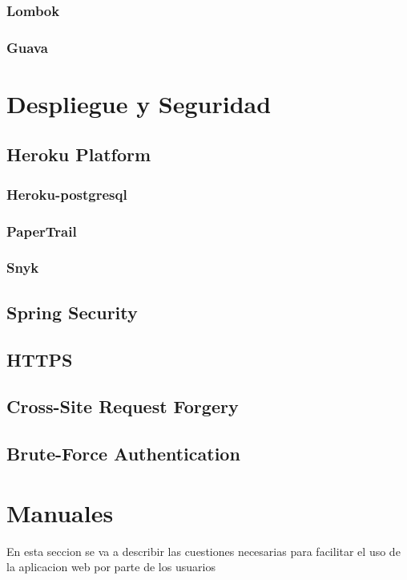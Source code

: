 \documentclass[a4paper]{report}
\begin{document}
    \subsubsection{Lombok}
    \subsubsection{Guava}

    \section{Despliegue y Seguridad}
        \subsection{Heroku Platform}
            \subsubsection{Heroku-postgresql}
            \subsubsection{PaperTrail}
            \subsubsection{Snyk}
        \subsection{Spring Security}
        \subsection{HTTPS}
        \subsection{Cross-Site Request Forgery}
        \subsection{Brute-Force Authentication}

    \section{Manuales}
    En esta seccion se va a describir las cuestiones necesarias para facilitar el uso de la aplicacion web por parte de los usuarios
\end{document}
